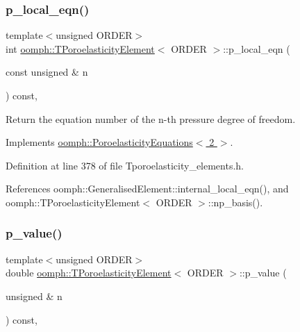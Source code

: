\subsubsection{\texorpdfstring{p\+\_\+local\+\_\+eqn()}{p\_local\_eqn()}}
{\footnotesize\ttfamily template$<$unsigned O\+R\+D\+ER$>$ \\
int \hyperlink{classoomph_1_1TPoroelasticityElement}{oomph\+::\+T\+Poroelasticity\+Element}$<$ O\+R\+D\+ER $>$\+::p\+\_\+local\+\_\+eqn (\begin{DoxyParamCaption}\item[{const unsigned \&}]{n }\end{DoxyParamCaption}) const\hspace{0.3cm}{\ttfamily [inline]}, {\ttfamily [virtual]}}



Return the equation number of the n-\/th pressure degree of freedom. 



Implements \hyperlink{classoomph_1_1PoroelasticityEquations_a98642c2cf0e476f4068c12d1fc8b61b9}{oomph\+::\+Poroelasticity\+Equations$<$ 2 $>$}.



Definition at line 378 of file Tporoelasticity\+\_\+elements.\+h.



References oomph\+::\+Generalised\+Element\+::internal\+\_\+local\+\_\+eqn(), and oomph\+::\+T\+Poroelasticity\+Element$<$ O\+R\+D\+E\+R $>$\+::np\+\_\+basis().

\mbox{\label{classoomph_1_1TPoroelasticityElement_a82a753eb277514e69bd44025a11c18d6}} 
\subsubsection{\texorpdfstring{p\+\_\+value()}{p\_value()}}
{\footnotesize\ttfamily template$<$unsigned O\+R\+D\+ER$>$ \\
double \hyperlink{classoomph_1_1TPoroelasticityElement}{oomph\+::\+T\+Poroelasticity\+Element}$<$ O\+R\+D\+ER $>$\+::p\+\_\+value (\begin{DoxyParamCaption}\item[{unsigned \&}]{n }\end{DoxyParamCaption}) const\hspace{0.3cm}{\ttfamily [inline]}, {\ttfamily [virtual]}}



